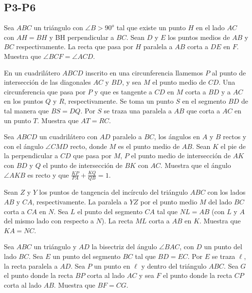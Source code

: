 \documentclass[11pt]{scrartcl}
\begin{document}
\subsection{P3-P6}
\begin{problem} [2000/6]
    Sea $ABC$ un triángulo con $\angle B > 90^o$ tal que existe un punto $H$ en el lado $AC$ con $AH = BH$ y BH perpendicular a $BC$. Sean $D$ y $E$ los puntos medios de $AB$ y $BC$ respectivamente. La recta que pasa por $H$ paralela a $AB$ corta a $DE$ en $F$. Muestra que $\angle BCF = \angle ACD$. 
\end{problem}
\begin{problem}[2001/3]
    En un cuadrilátero $ABCD$ inscrito en una circunferencia llamemos $P$ al punto de intersección de las diagonales $AC$ y $BD$, y sea $M$ el punto medio de $CD$. Una circunferencia que pasa por $P$ y que es tangente a $CD$ en $M$ corta a $BD$ y a $AC$ en los puntos $Q$ y $R$, respectivamente. Se toma un punto $S$ en el segmento $BD$ de tal manera que $BS=DQ$. Por $S$ se traza una paralela a $AB$ que corta a $AC$ en un punto $T$. Muestra que $AT=RC$.
    
    
\end{problem}
\begin{problem}[2002/6]
    Sea $ABCD$ un cuadrilátero con $AD$ paralelo a $BC$, los ángulos en $A$ y $B$ rectos y con el ángulo $\angle CMD$ recto, donde $M$ es el punto medio de $AB$. Sean $K$ el pie de la perpendicular a $CD$ que pasa por $M$, $P$ el punto medio de intersección de $AK$ con $BD$ y $Q$ el punto de intersección de $BK$ con $AC$. Muestra que el ángulo $\angle AKB$ es recto y que $\frac{KP}{PA} + \frac{KQ}{QB}=1$.    
\end{problem}
\begin{problem} [2004/1]
    
    Sean $Z$ y $Y$ los puntos de tangencia del incírculo del triángulo $ABC$ con los lados $AB$ y $CA$, respectivamente. La paralela a $YZ$ por el punto medio $M$ del lado $BC$ corta a $CA$ en $N$. Sea $L$ el punto del segmento $CA$ tal que $NL=AB$ (con $L$ y $A$ del mismo lado con respecto a $N$). La recta $ML$ corta a $AB$ en $K$. Muestra que $KA=NC$.
\end{problem}
\begin{problem} [2005/6]
    Sea $ABC$ un triángulo y $AD$ la bisectriz del ángulo $\angle BAC$, con $D$ un punto del lado $BC$. Sea $E$ un punto del segmento $BC$ tal que $BD=EC$. Por $E$ se traza $\ell$, la recta paralela a $AD$. Sea $P$ un punto en $\ell$ y dentro del triángulo $ABC$. Sea $G$ el punto donde la recta $BP$ corta al lado $AC$ y sea $F$ el punto donde la recta $CP$ corta al lado $AB$. Muestra que $BF=CG$.
\end{problem}
\end{document}
